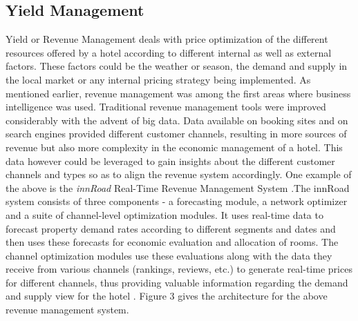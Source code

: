 \documentclass[sigconf]{acmart}
\begin{document}
\subsection{Yield Management}
Yield or Revenue Management deals with price optimization of the different resources offered by a hotel according to different internal as well as external factors. These factors could be the weather or season, the demand and supply in the local market or any internal pricing strategy being implemented.
\newline As mentioned earlier, revenue management was among the first areas where business intelligence was used. Traditional revenue management tools were improved considerably with the advent of big data. Data available on booking sites and on search engines provided different customer channels, resulting in more sources of revenue but also more complexity in the economic management of a hotel. This data however could be leveraged to gain insights about the different customer channels and types so as to align the revenue system accordingly. One example of the above is the {\em innRoad} Real-Time Revenue Management System \cite {bigdatarevenue09}.The innRoad system consists of three components - a forecasting module, a network optimizer and a suite of channel-level optimization modules. It uses real-time data to forecast property demand rates according to different segments and dates and then uses these forecasts for economic evaluation and allocation of rooms. The channel optimization modules use these evaluations along with the data they receive from various channels (rankings, reviews, etc.) to generate real-time prices for different channels, thus providing valuable information regarding the demand and supply view for the hotel \cite {bigdatarevenue09}. Figure 3 gives the architecture for the above revenue management system.
\end{document}
